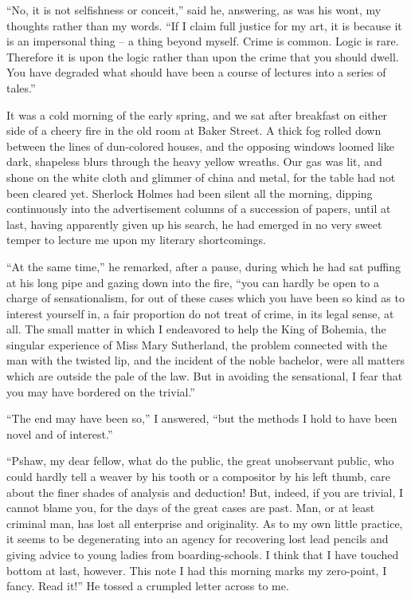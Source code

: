 “No, it is not selfishness or conceit,” said he, answering, as
was his wont, my thoughts rather than my words. “If I claim
full justice for my art, it is because it is an impersonal thing
-- a thing beyond myself. Crime is common. Logic is rare.
Therefore it is upon the logic rather than upon the crime that
you should dwell. You have degraded what should have been
a course of lectures into a series of tales.”

It was a cold morning of the early spring, and we sat after
breakfast on either side of a cheery fire in the old room at
Baker Street. A thick fog rolled down between the lines of
dun-colored houses, and the opposing windows loomed like
dark, shapeless blurs through the heavy yellow wreaths. Our
gas was lit, and shone on the white cloth and glimmer of
china and metal, for the table had not been cleared yet. Sherlock
Holmes had been silent all the morning, dipping continuously
into the advertisement columns of a succession of papers,
until at last, having apparently given up his search, he had
emerged in no very sweet temper to lecture me upon my literary
shortcomings.

“At the same time,” he remarked, after a pause, during
which he had sat puffing at his long pipe and gazing down
into the fire, “you can hardly be open to a charge of
sensationalism, for out of these cases which you have been so kind
as to interest yourself in, a fair proportion do not treat of
crime, in its legal sense, at all. The small matter in which I
endeavored to help the King of Bohemia, the singular experience
of Miss Mary Sutherland, the problem connected with
the man with the twisted lip, and the incident of the noble
bachelor, were all matters which are outside the pale of the
law. But in avoiding the sensational, I fear that you may
have bordered on the trivial.”

“The end may have been so,” I answered, “but the methods
I hold to have been novel and of interest.”

“Pshaw, my dear fellow, what do the public, the great
unobservant public, who could hardly tell a weaver by his tooth or
a compositor by his left thumb, care about the finer shades of
analysis and deduction! But, indeed, if you are trivial, I cannot
blame you, for the days of the great cases are past. Man,
or at least criminal man, has lost all enterprise and originality.
As to my own little practice, it seems to be degenerating into
an agency for recovering lost lead pencils and giving advice
to young ladies from boarding-schools. I think that I have
touched bottom at last, however. This note I had this morning
marks my zero-point, I fancy. Read it!” He tossed a
crumpled letter across to me.

